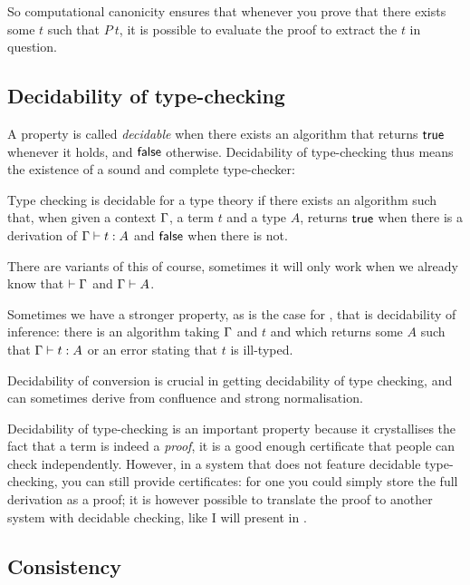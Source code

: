So computational canonicity ensures that whenever you prove that there exists
some \(t\) such that \(P\ t\), it is possible to evaluate the proof to extract
the \(t\) in question.

\subsection{Decidability of type-checking}

A property is called \emph{decidable} when there exists an algorithm that
returns \(\mathsf{true}\) whenever it holds, and \(\mathsf{false}\) otherwise.
Decidability of type-checking thus means the existence of a sound and complete
type-checker:

\begin{definition}
  Type checking is decidable for a type theory if there exists an algorithm
  such that, when given a context \(\Gamma\), a term \(t\) and a type \(A\),
  returns \(\mathsf{true}\) when there is a derivation of \(\Gamma \vdash t : A\)
  and \(\mathsf{false}\) when there is not.
\end{definition}

There are variants of this of course, sometimes it will only work when we
already know that \(\vdash \Gamma\) and \(\Gamma \vdash A\).

Sometimes we have a stronger property, as is the case for \Coq, that is
decidability of inference:
there is an algorithm taking \(\Gamma\) and \(t\) and which returns some \(A\)
such that \(\Gamma \vdash t : A\) or an error stating that \(t\) is ill-typed.

Decidability of conversion is crucial in getting decidability of type
checking, and can sometimes derive from confluence and strong normalisation.

Decidability of type-checking is an important property because it crystallises
the fact that a term is indeed a \emph{proof}, it is a good enough certificate
that people can check independently.
However, in a system that does not feature decidable type-checking, you can
still provide certificates: for one you could simply store the full derivation
as a proof; it is however possible to translate the proof to another system with
decidable checking, like I will present in .

\subsection{Consistency}

